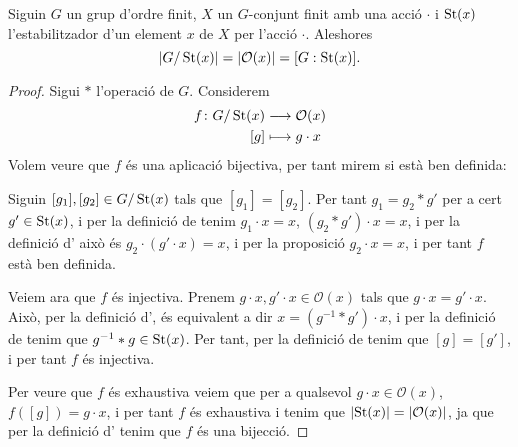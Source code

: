 \documentclass[../Apunts.tex]{subfiles}
\begin{document}
	\begin{proposition}
		\label{prop:cardinal del grup dividit per cardinal de l'estabilitzador és el cardinal de l'òrbita}
		Siguin \(G\) un grup d'ordre finit, \(X\) un \(G\)-conjunt finit amb una acció \(\cdot\) i \(\operatorname{St}(x)\) l'estabilitzador d'un element \(x\) de \(X\) per l'acció \(\cdot\). Aleshores
		\[\abs{G/\St(x)}=\abs{\mathcal{O}(x)}=[G:\St(x)].\]
		\begin{proof}
			Sigui \(\ast\) l'operació de \(G\). Considerem
			\begin{align*}
			f\colon G/\operatorname{St}(x)&\longrightarrow\mathcal{O}(x)\\
			[g]&\longmapsto g\cdot x
			\end{align*}
			Volem veure que \(f\) és una aplicació bijectiva, per tant mirem si està ben definida:
			
			Siguin \([g_{1}],[g_{2}]\in G/\operatorname{St}(x)\) tals que \([g_{1}]=[g_{2}]\). Per tant \(g_{1}=g_{2}\ast g'\) per a cert \(g'\in\operatorname{St}(x)\), i per la definició de  tenim \(g_{1}\cdot x=x\), \((g_{2}\ast g')\cdot x=x\), i per la definició d' això és \(g_{2}\cdot(g'\cdot x)=x\), i per la proposició  \(g_{2}\cdot x=x\), i per tant \(f\) està ben definida.
			
			Veiem ara que \(f\) és injectiva. Prenem \(g\cdot x,g'\cdot x\in\mathcal{O}(x)\) tals que \(g\cdot x=g'\cdot x\). Això, per la definició d', és equivalent a dir \(x=(g^{-1}\ast g')\cdot x\), i per la definició de  tenim que \(g^{-1}\ast g\in\operatorname{St}(x)\). Per tant, per la definició de  tenim que \([g]=[g']\), i per tant \(f\) és injectiva.
			
			Per veure que \(f\) és exhaustiva veiem que per a qualsevol \(g\cdot x\in\mathcal{O}(x)\), \(f([g])=g\cdot x\), i per tant \(f\) és exhaustiva i tenim que \(\abs{\St(x)}=\abs{\mathcal{O}(x)}\), ja que per la definició d' tenim que \(f\) és una bijecció. %
		\end{proof}
	\end{proposition}
\end{document}
